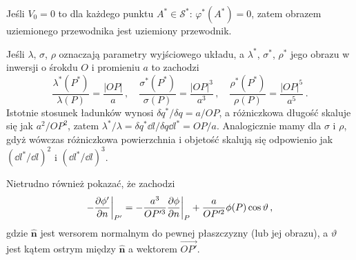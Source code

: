 \documentclass[../main.tex]{subfiles}
\begin{document}
\medskip

Jeśli \(V_0=0\) to dla każdego punktu \(A^*\in\mathcal{S}^*\): \(\varphi^*(A^*)=0\), zatem obrazem uziemionego przewodnika jest uziemiony przewodnik.
\medskip

Jeśli \(\lambda\), \(\sigma\), \(\rho\) oznaczają parametry wyjściowego układu, a \(\lambda^*\), \(\sigma^*\), \(\rho^*\) jego obrazu w inwersji o śrokdu \(O\) i promieniu \(a\) to zachodzi
\begin{equation*}
    \frac{\lambda^*(P^*)}{\lambda(P)}=\frac{|OP|}{a}\,,\quad\frac{\sigma^*(P^*)}{\sigma(P)}=\frac{|OP|^3}{a^3}\,,\quad \frac{\rho^*(P^*)}{\rho(P)}=\frac{|OP|^5}{a^5}\,.
\end{equation*}
Istotnie stosunek ładunków wynosi \(\delta q^*/\delta q=a/OP\), a różniczkowa długość skaluje się jak \(a^2/OP^2\), zatem \(\lambda^*/\lambda=\delta q^*\dd{l}/\delta q\dd{l^*}=OP/a\). Analogicznie mamy dla \(\sigma\) i \(\rho\), gdyż wówczas różniczkowa powierzchnia i objetość skalują się odpowienio jak \((\dd{l^*}/\dd{l})^2\) i \((\dd{l^*}/\dd{l})^3\).
\medskip

Nietrudno również pokazać, że zachodzi
\begin{equation*}
    -\pdv{\phi'}{n}\bigg|_{P'}=-\frac{a^3}{OP'^3}\pdv{\phi}{n}\bigg|_{P}+\frac{a}{OP'^2}\phi(P)\cos\vartheta\,,
\end{equation*}
gdzie \(\mathbf{\hat{n}}\) jest wersorem normalnym do pewnej płaszczyzny (lub jej obrazu), a \(\vartheta\) jest kątem ostrym między \(\mathbf{\hat{n}}\) a wektorem \(\overrightarrow{OP'}\).
\end{document}
